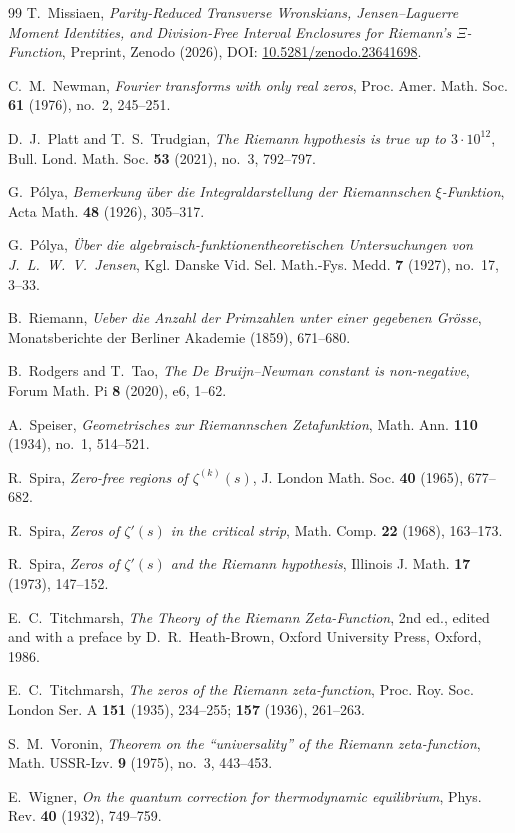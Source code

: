 \documentclass[11pt,a4paper,reqno]{amsart}
\theoremstyle{definition}
\theoremstyle{remark}
\numberwithin{equation}{section}
\begin{document}
\begin{thebibliography}{99}
T.~Missiaen, \emph{Parity-Reduced Transverse Wronskians, Jensen--Laguerre Moment Identities, and Division-Free Interval Enclosures for Riemann's $\Xi$-Function}, Preprint, Zenodo (2026), DOI: \href{https://doi.org/10.5281/zenodo.23641698}{10.5281/zenodo.23641698}.

C.~M.~Newman, \emph{Fourier transforms with only real zeros}, Proc. Amer. Math. Soc. \textbf{61} (1976), no.~2, 245--251.

D.~J.~Platt and T.~S.~Trudgian, \emph{The Riemann hypothesis is true up to $3\cdot 10^{12}$}, Bull. Lond. Math. Soc. \textbf{53} (2021), no.~3, 792--797.

G.~P\'olya, \emph{Bemerkung \"uber die Integraldarstellung der Riemannschen $\xi$-Funktion}, Acta Math. \textbf{48} (1926), 305--317.

G.~P\'olya, \emph{\"Uber die algebraisch-funktionentheoretischen Untersuchungen von J.~L.~W.~V.~Jensen}, Kgl. Danske Vid. Sel. Math.-Fys. Medd. \textbf{7} (1927), no.~17, 3--33.

B.~Riemann, \emph{Ueber die Anzahl der Primzahlen unter einer gegebenen Gr\"osse}, Monatsberichte der Berliner Akademie (1859), 671--680.

B.~Rodgers and T.~Tao, \emph{The De Bruijn--Newman constant is non-negative}, Forum Math. Pi \textbf{8} (2020), e6, 1--62.

A.~Speiser, \emph{Geometrisches zur Riemannschen Zetafunktion}, Math. Ann. \textbf{110} (1934), no.~1, 514--521.

R.~Spira, \emph{Zero-free regions of $\zeta^{(k)}(s)$}, J. London Math. Soc. \textbf{40} (1965), 677--682.

R.~Spira, \emph{Zeros of $\zeta'(s)$ in the critical strip}, Math. Comp. \textbf{22} (1968), 163--173.

R.~Spira, \emph{Zeros of $\zeta'(s)$ and the Riemann hypothesis}, Illinois J. Math. \textbf{17} (1973), 147--152.

E.~C.~Titchmarsh, \emph{The Theory of the Riemann Zeta-Function}, 2nd ed., edited and with a preface by D.~R.~Heath-Brown, Oxford University Press, Oxford, 1986.

E.~C.~Titchmarsh, \emph{The zeros of the Riemann zeta-function}, Proc. Roy. Soc. London Ser. A \textbf{151} (1935), 234--255; \textbf{157} (1936), 261--263.

S.~M.~Voronin, \emph{Theorem on the ``universality'' of the Riemann zeta-function}, Math. USSR-Izv. \textbf{9} (1975), no.~3, 443--453.

E.~Wigner, \emph{On the quantum correction for thermodynamic equilibrium}, Phys. Rev. \textbf{40} (1932), 749--759.

\end{thebibliography}
\end{document}
